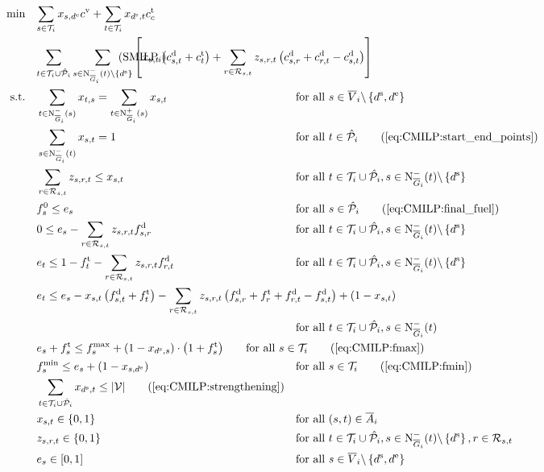 \begin{align}
	\min \quad & \omit\rlap{$\displaystyle{\sum_{s\in\Ti} x_{s,\de}\cv + \sum_{t\in\Ti} x_{\ds, t}\ct_c}$} \nonumber \\
	& \omit\rlap{$\displaystyle{\sum_{t\in\Ti\cup\Phat_i}\sum_{s\in\Ninoi(t)\backslash\left\{\ds\right\}}\left[x_{s,t}\left(\cd_{s,t}+\ct_t\right)+\sum_{r\in\Rst}z_{s,r,t}\left(\cd_{s,r}+\cd_{r,t}-\cd_{s,t}\right)\right]}$} \tag{$\operatorname{SMILP}_i$} \label{eq:SMILPi} \\
	\text{s.t.} \quad & \sum_{t\in\Ninoi(s)} x_{t,s} = \sum_{t\in\Noutoi(s)} x_{s,t} & & \text{for all } s\in \overline{V}_i\backslash\left\{\ds,\de\right\} \label{eq:CMILP:flow} \\
	& \sum_{s\in\Ninoi(t)} x_{s,t} = 1 && \text{for all } t\in\Phat_i \tag{\ref{eq:CMILP:start_end_points}} \\	
	& \sum_{r\in\Rst} z_{s,r,t} \leq x_{s,t} && \text{for all } t\in\Ti\cup\Phat_i, s\in\Ninoi(t)\backslash\left\{\ds\right\} \label{eq:CMILP:refuel} \\
	& f^0_s \leq e_s && \text{for all } s\in\Phat_i \tag{\ref{eq:CMILP:final_fuel}} \\
	& 0 \leq e_s - \sum_{r\in\Rst} z_{s,r,t}\fd_{s,r} & & \text{for all } t\in\Ti\cup\Phat_i, s\in\Ninoi(t)\backslash\left\{\ds\right\} \label{eq:CMILP:min_fuel} \\
	& e_t \leq 1 - \ft_t - \sum_{r\in\Rst} z_{s,r,t}\fd_{r,t} & & \text{for all } t\in\Ti\cup\Phat_i, s\in\Ninoi(t)\backslash\left\{\ds\right\} \label{eq:CMILP:max_fuel} \\
	& \omit\rlap{$\displaystyle{e_t \leq e_s - x_{s,t}\left(f_{s,t}^{\operatorname{d}}+f_t^{\operatorname{t}}\right) - \sum_{r\in\Rst} z_{s,r,t}\left(\fd_{s,r}+\ft_r+\fd_{r,t}-\fd_{s,t}\right) + \left(1-x_{s,t}\right)}$} \nonumber \\
	& & & \text{for all } t\in\Ti\cup\Phat_i, s\in\Ninoi(t) \label{eq:CMILP:fuel_consumption} \\
	& \omit\rlap{$\displaystyle{e_s + \ft_s \leq f^{\max}_s + \left(1-x_{\ds,s}\right)\cdot\left(1+\ft_s\right)} \qquad \text{for all } s\in\Ti \tag{\ref{eq:CMILP:fmax}}$} \\
	& f^{\min}_s \leq e_s + \left(1-x_{s,\de}\right) && \text{for all } s\in\Ti \tag{\ref{eq:CMILP:fmin}} \\
	& \sum_{t\in\Ti\cup\Phat_i} x_{\ds,t} \leq \vert\mathcal{V}\vert \tag{\ref{eq:CMILP:strengthening}} \\
	& x_{s,t}\in\{0,1\} & & \text{for all } (s,t)\in\overline{A}_i \label{eq:CMILP:xst} \\
	& z_{s,r,t}\in\{0,1\} & & \text{for all } t\in\Ti\cup\Phat_i,s\in\Ninoi(t)\backslash\left\{\ds\right\},r\in\Rst \label{eq:CMILP:zsrt} \\
	& e_s\in[0,1] & & \text{for all } s\in\overline{V}_i\backslash\left\{\ds,\de\right\} \label{eq:CMILP:es}
\end{align}

